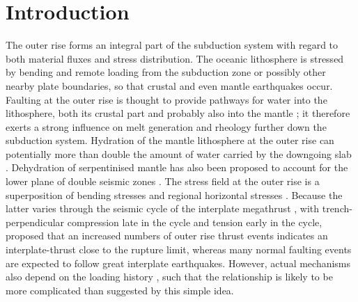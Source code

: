 \documentclass[reviewcopy]{elsarticle}
\providecommand{\pagewiselinenumbers}{}
\begin{document}
\pagewiselinenumbers
\section{Introduction}

The outer rise forms an integral part of the subduction system with
regard to both material fluxes and stress distribution. The oceanic lithosphere is stressed by
bending and remote loading from the subduction zone or possibly other nearby plate boundaries, so that crustal and even mantle earthquakes occur.
Faulting at the outer rise is thought to provide pathways for water into the
lithosphere, both its crustal part \citep{kirby96} and probably also
into the mantle  \citep{ranero03,ranero04,grevemeyer07}; it therefore exerts a strong
influence on melt generation and rheology further down the subduction
system.  Hydration of the mantle lithosphere at the outer rise can
potentially more than double the amount of water carried by the
downgoing slab \citep{rupke04}. Dehydration of serpentinised mantle
has also been proposed to account for the lower plane of double
seismic zones \citep{peacock01}.
 The  stress field at the outer rise is a superposition of bending
stresses and regional horizontal stresses \citep{christensen88}.
Because the latter varies through the seismic cycle of the interplate
megathrust \citep[e.g.][]{taylor96}, with trench-perpendicular
compression late in the cycle and tension early in the cycle,
\citet{christensen88} proposed that an
increased numbers of outer rise thrust events indicates an
interplate-thrust close to the rupture limit, whereas many normal faulting events
are expected to follow great interplate earthquakes. However, actual
mechanisms also depend on the loading history \citep{mueller96b}, such that the
relationship is likely to be more complicated than suggested by this
simple idea.
\end{document}
